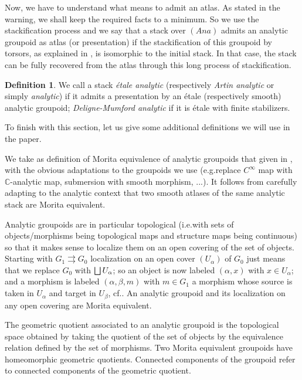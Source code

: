 \documentclass[10pt]{amsart}
\let\oldbigsqcup\bigsqcup
\renewcommand{\bigsqcup}{\mathop{\textstyle\oldbigsqcup}\displaylimits}
\newcommand{\Ana}{\mathit{Ana}}
\theoremstyle{plain}
\theoremstyle{definition}
\newtheorem{definition}[theorem]{Definition}
\theoremstyle{remark}
\numberwithin{equation}{section}
\newcommand{\CC}{{\mathbb{C}}}
\providecommand{\eg}{e.g.}\providecommand{\ie}{i.e.}\providecommand{\etc}{etc.}\providecommand{\resp}{resp.}\providecommand{\cf}{cf.}
\begin{document}
Now, we have to understand what means to admit an atlas. As stated in the warning, we shall keep the required facts to a minimum. So we use the stackification process and we say that a stack over $(\Ana)$ admits an analytic groupoid as atlas (or presentation) if the stackification of this groupoid by torsors, as explained in \cite[Chs.\,3\,\&\,4]{BCEFFGK}, is isomorphic to the initial stack. In that case, the stack can be fully recovered from the atlas through this long process of stackification.

\begin{definition}
\label{Artinstacks}
We call a stack \emph{étale analytic} (respectively \emph{Artin analytic} or simply \emph{analytic}) if it admits a presentation by an étale (respectively smooth) analytic groupoid; \emph{Deligne-Mumford analytic} if it is étale with finite stabilizers.
\end{definition}

To finish with this section, let us give some additional definitions we will use in the paper.

We take as definition of Morita equivalence of analytic groupoids that given in \cite[\S 5.4]{Moerdijk}, with the obvious adaptations to the groupoids we use (\eg replace $C^\infty$ map with $\CC$-analytic map, submersion with smooth morphism, ...). It follows from carefully adapting \cite{BCEFFGK} to the analytic context that two smooth atlases of the same analytic stack are Morita equivalent.

Analytic groupoids are in particular topological (\ie with sets of objects/morphisms being topological maps and structure maps being continuous) so that it makes sense to localize them on an open covering of the set of objects. Starting with $G_1\rightrightarrows G_0$ localization on an open cover $(U_\alpha)$ of $G_0$ just means that we replace $G_0$ with $\bigsqcup U_\alpha$; so an object is now labeled $(\alpha,x)$ with $x\in U_\alpha$; and a morphism is labeled $(\alpha,\beta,m)$ with $m\in G_1$ a morphism whose source is taken in $U_\alpha$ and target in $U_\beta$, \cf \cite{Ha}. An analytic groupoid and its localization on any open covering are Morita equivalent.

The geometric quotient associated to an analytic groupoid is the topological space obtained by taking the quotient of the set of objects by the equivalence relation \hbox{defined} by the set of morphisms. Two Morita equivalent groupoids have homeomorphic geometric quotients. Connected components of the groupoid refer to connected components of the geometric quotient.
\end{document}
